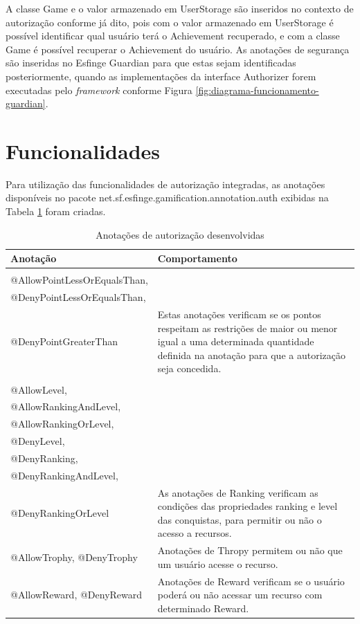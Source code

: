 \par A classe Game e o valor armazenado em UserStorage são inseridos no contexto de autorização conforme já dito, pois com o valor armazenado em UserStorage é possível identificar qual usuário terá o Achievement recuperado, e com a classe Game é possível recuperar o Achievement do usuário. As anotações de segurança são inseridas no Esfinge Guardian para que estas sejam identificadas posteriormente, quando as implementações da interface Authorizer forem executadas pelo \textit{framework} conforme Figura \ref{fig:diagrama-funcionamento-guardian}.

\section{Funcionalidades}

\par Para utilização das funcionalidades de autorização integradas, as anotações disponíveis no pacote net.sf.esfinge.gamification.annotation.auth exibidas na Tabela \ref{tab:autorizacoes} foram criadas.

\begin{longtable}{|l|m{9cm}|}
\caption{Anotações de autorização desenvolvidas}\\
\hline
Anotação & Comportamento \\ \hline
\endfirsthead
\endhead
\begin{tabular}[c]{@{}l@{}}
@AllowPointGreaterThan,\\ @AllowPointLessOrEqualsThan,\\ @DenyPointLessOrEqualsThan, \\ @DenyPointGreaterThan
\end{tabular} & Estas anotações verificam se os pontos respeitam as restrições de maior ou menor igual a uma determinada quantidade definida na anotação para que a autorização seja concedida. \\ \hline
\begin{tabular}[c]{@{}l@{}}
@AllowRanking,\\
@AllowLevel,\\ 
@AllowRankingAndLevel,\\
@AllowRankingOrLevel,\\ 
@DenyLevel,\\
@DenyRanking,\\ 
@DenyRankingAndLevel,\\
@DenyRankingOrLevel
\end{tabular} & As anotações de Ranking verificam as condições das propriedades ranking e level das conquistas, para permitir ou não o acesso a recursos. \\ \hline
@AllowTrophy, @DenyTrophy & Anotações de Thropy permitem ou não que um usuário acesse o recurso. \\ \hline
@AllowReward, @DenyReward & Anotações de Reward verificam se o usuário poderá ou não acessar um recurso com determinado Reward.
\label{tab:autorizacoes}
\\ \hline
\end{longtable}

